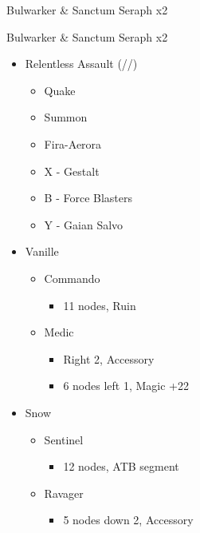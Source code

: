 \begin{paracol}{2}
\begin{battle}{Bulwarker \& Sanctum Seraph x2}
\end{battle}
\switchcolumn
\begin{battle}{Bulwarker \& Sanctum Seraph x2}
\begin{itemize}
    \item [2] Relentless Assault (\rav/\rav/\com)
    \begin{itemize}
        \item Quake
        \item Summon
        \item Fira-Aerora
        \item X - Gestalt
        \item B - Force Blasters
        \item Y - Gaian Salvo
    \end{itemize}
\end{itemize}
\end{battle}
\switchcolumn*
\begin{menu}
	\begin{itemize}
		\crystarium
		\begin{itemize}
			\item Vanille
			      \begin{itemize}
				      \item Commando
				            \begin{itemize}
					            \item 11 nodes, Ruin
				            \end{itemize}
				      \item Medic
				            \begin{itemize}
					            \item Right 2, Accessory
					            \item 6 nodes left 1, Magic +22
				            \end{itemize}
			      \end{itemize}
			\item Snow
			      \begin{itemize}
				      \item Sentinel
				            \begin{itemize}
					            \item 12 nodes, ATB segment
				            \end{itemize}
				      \item Ravager
				            \begin{itemize}
					            \item 5 nodes down 2, Accessory

\end{itemize}
\end{itemize}
\end{itemize}
\end{itemize}
\end{menu}
\end{paracol}
